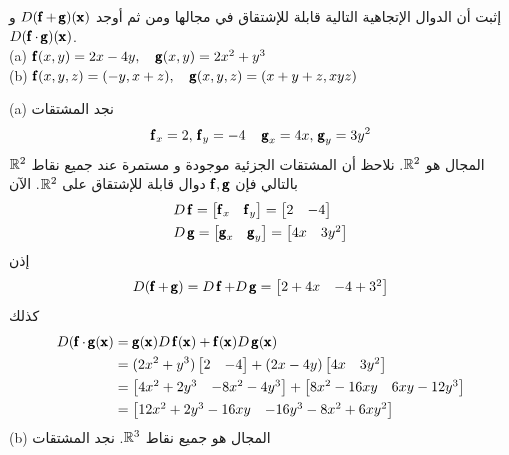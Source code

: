 \begin{example}
    إثبت أن الدوال الإتجاهية التالية قابلة للإشتقاق في مجالها ومن ثم أوجد $D(\f+\g)(\x)$ و $D(\f\cdot\g)(\x)$.\\[5pt]
    (a) $\f(x,y)=2x-4y,\quad \g(x,y)=2x^2+y^3$\\[5pt]
    (b) $\f(x,y,z)=(-y,x+z),\quad \g(x,y,z)=(x+y+z,xyz)$
\end{example}
\begin{solution}
(a) نجد المشتقات
\[
\f_x=2,\,\f_y=-4\quad \g_x=4x,\,\g_y=3y^2
\] 
المجال هو $\R^2$. نلاحظ أن المشتقات الجزئية موجودة و مستمرة عند جميع نقاط $\R^2$ بالتالي فإن $\f,\g$ دوال قابلة للإشتقاق على $\R^2$. الآن
\begin{align*}
   & D\f=\begin{bmatrix}
        \f_x&\f_y
    \end{bmatrix}=\begin{bmatrix}
        2&-4
    \end{bmatrix}\\
   & D\g=\begin{bmatrix}
        \g_x&\g_y
    \end{bmatrix}=\begin{bmatrix}
        4x&3y^2
    \end{bmatrix}
\end{align*}
إذن
\[
D(\f+\g)=D\f+D\g=\begin{bmatrix}
    2+4x&-4+3^2
\end{bmatrix}
\]
كذلك
\begin{align*}
    D(\f\cdot\g(\x)&=\g(\x)D\f(\x)+\f(\x)D\g(\x)\\
    &=(2x^2+y^3)\begin{bmatrix}
        2&-4
    \end{bmatrix}+(2x-4y)\begin{bmatrix}
        4x&3y^2
    \end{bmatrix}\\
    &=\begin{bmatrix}
        4x^2+2y^3&-8x^2-4y^3
    \end{bmatrix}+\begin{bmatrix}
        8x^2-16xy&6xy-12y^3
    \end{bmatrix}\\
    &=\begin{bmatrix}
        12x^2+2y^3-16xy&-16y^3-8x^2+6xy^2
    \end{bmatrix}
\end{align*}
(b) المجال هو جميع نقاط $\R^3$. نجد المشتقات 
\begin{align*}

\end{align*}
\end{solution}
